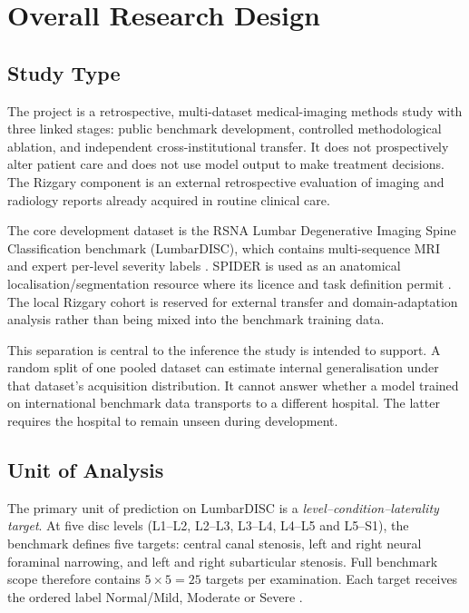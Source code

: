 \section{Overall Research Design}
\label{sec:method-design}

\subsection{Study Type}
\label{sec:method-study-type}

The project is a retrospective, multi-dataset medical-imaging methods study with
three linked stages: public benchmark development, controlled methodological
ablation, and independent cross-institutional transfer. It does not prospectively
alter patient care and does not use model output to make treatment decisions.
The Rizgary component is an external retrospective evaluation of imaging and
radiology reports already acquired in routine clinical care.

The core development dataset is the RSNA Lumbar Degenerative Imaging Spine
Classification benchmark (LumbarDISC), which contains multi-sequence MRI and
expert per-level severity labels \cite{rsna2024rsna,richards2026the}. SPIDER is
used as an anatomical localisation/segmentation resource where its licence and
task definition permit \cite{vandergraaf2024lumbar}. The local Rizgary cohort is
reserved for external transfer and domain-adaptation analysis rather than being
mixed into the benchmark training data.

This separation is central to the inference the study is intended to support. A
random split of one pooled dataset can estimate internal generalisation under
that dataset's acquisition distribution. It cannot answer whether a model
trained on international benchmark data transports to a different hospital.
The latter requires the hospital to remain unseen during development.

\subsection{Unit of Analysis}
\label{sec:method-unit}

The primary unit of prediction on LumbarDISC is a
\emph{level--condition--laterality target}. At five disc levels
(L1--L2, L2--L3, L3--L4, L4--L5 and L5--S1), the benchmark defines five targets:
central canal stenosis, left and right neural foraminal narrowing, and left and
right subarticular stenosis. Full benchmark scope therefore contains
$5\times5=25$ targets per examination. Each target receives the ordered label
Normal/Mild, Moderate or Severe \cite{richards2026the}.

